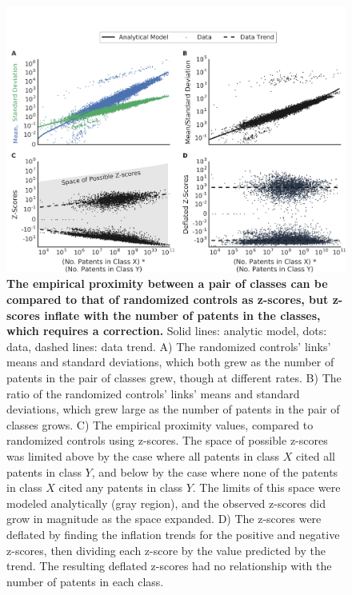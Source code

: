 \documentclass[]{svjour3}
\begin{document}
\begin{figure}[ht!]
\begin{center}
\includegraphics[width=\textwidth]{figs/Z_Score_Inflation_Direct_Citation_IPC.png} 
\end{center}
\caption{\textbf{The empirical proximity between a pair of classes can be compared to that of randomized controls as z-scores, but z-scores inflate with the number of patents in the classes, which requires a correction.} 
Solid lines: analytic model, dots: data, dashed lines: data trend.
A) The randomized controls' links' means and standard deviations, which both grew as the number of patents in the pair of classes grew, though at different rates.
B) The ratio of the randomized controls' links' means and standard deviations, which grew large as the number of patents in the pair of classes grows.
C) The empirical proximity values, compared to randomized controls using z-scores. The space of possible z-scores was limited above by the case where all patents in class $X$ cited all patents in class $Y$, and below by the case where none of the patents in class $X$ cited any patents in class $Y$. The limits of this space were modeled analytically (gray region), and the observed z-scores did grow in magnitude as the space expanded.
D) The z-scores were deflated by finding the inflation trends for the positive and negative z-scores, then dividing each z-score by the value predicted by the trend. The resulting deflated z-scores had no relationship with the number of patents in each class.
}\label{z-score_deflation}
\end{figure}
\end{document}
